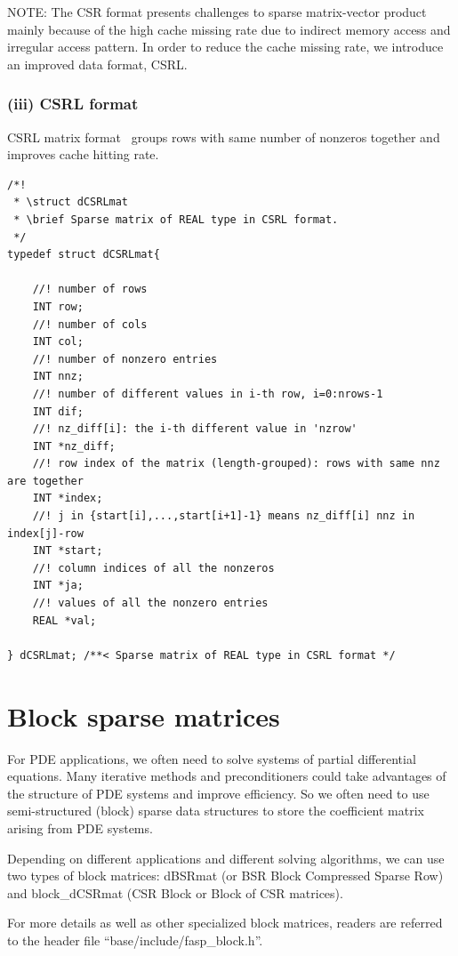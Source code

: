 \documentclass[11pt]{memoir}
\begin{document}
\begin{snugshade}\noindent
NOTE: The CSR format presents challenges to sparse matrix-vector product mainly because of the high cache missing rate due to indirect memory access and irregular access pattern. In order to reduce the cache missing rate, we introduce an improved data format, CSRL.
\end{snugshade}

\subsubsection*{(iii) CSRL format}

CSRL matrix format~\cite{Mellor-crummey2004} groups rows with same number of nonzeros together and improves cache hitting rate.
\begin{lstlisting}
/*!
 * \struct dCSRLmat
 * \brief Sparse matrix of REAL type in CSRL format.
 */
typedef struct dCSRLmat{

	//! number of rows	
	INT row;
	//! number of cols
	INT col;
	//! number of nonzero entries
	INT nnz;
	//! number of different values in i-th row, i=0:nrows-1
	INT dif;
	//! nz_diff[i]: the i-th different value in 'nzrow'
	INT *nz_diff;
	//! row index of the matrix (length-grouped): rows with same nnz are together
	INT *index;
	//! j in {start[i],...,start[i+1]-1} means nz_diff[i] nnz in index[j]-row	
	INT *start;
	//! column indices of all the nonzeros
	INT *ja;
	//! values of all the nonzero entries
	REAL *val;

} dCSRLmat; /**< Sparse matrix of REAL type in CSRL format */
\end{lstlisting}

\section{Block sparse matrices}

For PDE applications, we often need to solve systems of partial differential equations. Many iterative methods and preconditioners could take advantages of the structure of PDE systems and improve efficiency. So we often need to use semi-structured (block) sparse data structures to store the coefficient matrix arising from PDE systems. 

Depending on different applications and different solving algorithms, we can use two types of block matrices: dBSRmat (or BSR Block Compressed Sparse Row) and block\_dCSRmat (CSR Block or Block of CSR matrices). 

\begin{snugshade}\noindent
For more details as well as other specialized block matrices, readers are referred to the header file ``base/include/fasp\_block.h''.
\end{snugshade}
\end{document}
